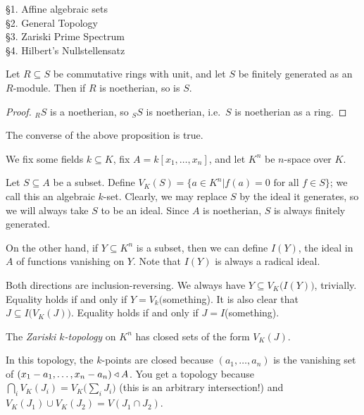  \setcounter{lecture}{17}

 \S 1. Affine algebraic sets\\
 \S 2. General Topology\\
 \S 3. Zariski Prime Spectrum\\
 \S 4. Hilbert's Nullstellensatz

 \smallskip

 \begin{proposition}[``Going Up'']
   Let $R\subseteq S$ be commutative rings with unit, and let $S$ be finitely generated
   as an $R$-module. Then if $R$ is noetherian, so is $S$.
 \end{proposition}
 \begin{proof}
   ${}_R S$ is a noetherian, so ${}_S S$ is noetherian, i.e.\ $S$ is noetherian as a
   ring.
 \end{proof}
 \begin{theorem}
   The converse of the above proposition is true.
 \end{theorem}


 We fix some fields $k\subseteq K$, fix $A=k[x_1,\dots,x_n]$, and let $K^n$ be $n$-space
 over $K$.

 Let $S\subseteq A$ be a subset. Define $V_K(S)=\{a\in K^n|f(a)=0 \text{ for all }f\in
 S\}$; we call this an algebraic $k$-set. Clearly, we may replace $S$ by the ideal it
 generates, so we will always take $S$ to be an ideal. Since $A$ is noetherian, $S$ is
 always finitely generated.

 On the other hand, if $Y\subseteq K^n$ is a subset, then we can define $I(Y)$, the
 ideal in $A$ of functions vanishing on $Y$. Note that $I(Y)$ is always a radical ideal.

 Both directions are inclusion-reversing. We always have $Y\subseteq
 V_K\bigl(I(Y)\bigr)$, trivially. Equality holds if and only if $Y=V_k($something). It is
 also clear that $J\subseteq I\bigl(V_K(J)\bigr)$. Equality holds if and only if
 $J=I$(something).

 \begin{definition}
   The \emph{Zariski $k$-topology} on $K^n$ has closed sets of the form $V_K(J)$.
 \end{definition}
 In this topology, the $k$-points are closed because $(a_1,\dots,a_n)$ is the vanishing
 set of $(x_1-a_1,\dots, x_n-a_n)\triangleleft A$. You get a topology because $\bigcap_i
 V_K(J_i)=V_K\bigl(\sum_i J_i\bigr)$ (this is an arbitrary intersection!) and
 $V_K(J_1)\cup V_K(J_2)=V(J_1\cap J_2)$.

